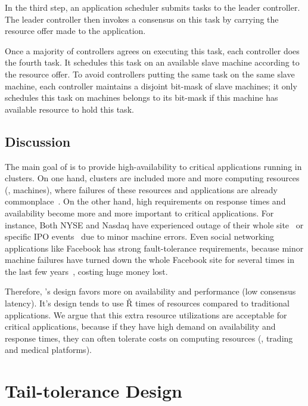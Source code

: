 In the third step, an application scheduler submits tasks to the leader 
controller. The leader controller then invokes a consensus on this task by 
carrying the resource offer made to the application.

Once a majority of controllers agrees on executing this task, each controller 
does the fourth task. It schedules this task on an available slave machine 
according to the resource offer. To avoid controllers putting the same task on 
the same slave machine, each controller maintains a disjoint bit-mask of slave 
machines; it only schedules this task on machines belongs to its bit-mask if 
this machine has available resource to hold this task.


\subsection{Discussion} \label{sec:discuss}

The main goal of \xxx is to provide high-availability to critical applications 
running in clusters. On one hand, clusters are included more and more computing 
resources (\eg, machines), where failures of these resources and applications 
are already commonplace~\cite{facebook:outage}. On the other hand, 
high requirements on response times and availability become more and more 
important to critical applications. For instance, Both NYSE and Nasdaq have 
experienced outage of their whole site~\cite{nyse:halt} or specific IPO 
events~\cite{facebook:ipo:delay} due to minor machine errors.  Even social 
networking applications like Facebook has strong fault-tolerance requirements, 
because minor machine failures have turned down the whole Facebook site for 
several times in the last few years~\cite{facebook:outage}, costing huge 
money lost. 

Therefore, \xxx's design favors more on availability and performance 
(low consensus latency). It's design tends to use \v{R} times of resources 
compared to traditional applications. We argue that this extra resource 
utilizations are acceptable for critical applications, because if they have high 
demand on availability and response times, they can often tolerate costs on 
computing resources (\eg, trading and medical platforms).


\section{Tail-tolerance Design} \label{sec:tail}

